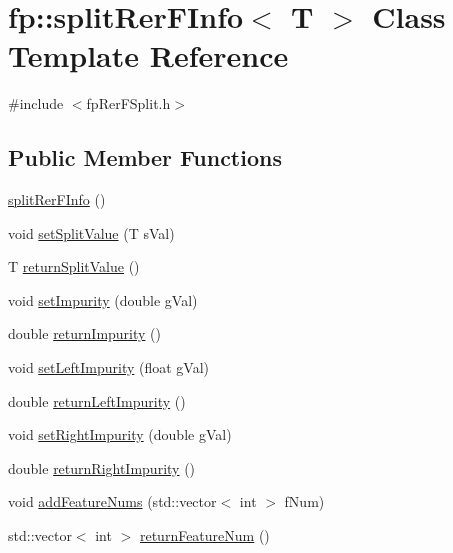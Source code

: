\hypertarget{classfp_1_1splitRerFInfo}{}\section{fp\+:\+:split\+Rer\+F\+Info$<$ T $>$ Class Template Reference}
\label{classfp_1_1splitRerFInfo}


{\ttfamily \#include $<$fp\+Rer\+F\+Split.\+h$>$}

\subsection*{Public Member Functions}
\begin{DoxyCompactItemize}
\item 
\hyperlink{classfp_1_1splitRerFInfo_a2071cff382e045b856f29d9fed7f2e8e}{split\+Rer\+F\+Info} ()
\item 
void \hyperlink{classfp_1_1splitRerFInfo_a461777b91ece075a5a2123c348f4b4c4}{set\+Split\+Value} (T s\+Val)
\item 
T \hyperlink{classfp_1_1splitRerFInfo_a99b2dfae4d0e606be9511bd6c61b53dc}{return\+Split\+Value} ()
\item 
void \hyperlink{classfp_1_1splitRerFInfo_ac1ad89a7c7cbc2bd8f7ffb3aa523b1eb}{set\+Impurity} (double g\+Val)
\item 
double \hyperlink{classfp_1_1splitRerFInfo_a79dc984d11d69e61abc7f546e9effd90}{return\+Impurity} ()
\item 
void \hyperlink{classfp_1_1splitRerFInfo_af7409ccd3d123780aa9e6b3fe24df589}{set\+Left\+Impurity} (float g\+Val)
\item 
double \hyperlink{classfp_1_1splitRerFInfo_a744a6c0b2f76ce9b74f35a59642b9837}{return\+Left\+Impurity} ()
\item 
void \hyperlink{classfp_1_1splitRerFInfo_a31171db1e7a89e0448668c03cd4adf7c}{set\+Right\+Impurity} (double g\+Val)
\item 
double \hyperlink{classfp_1_1splitRerFInfo_a436810df96a0cdec2c8aab72609a1210}{return\+Right\+Impurity} ()
\item 
void \hyperlink{classfp_1_1splitRerFInfo_a2494bbdac133a9e3276a2d7ed7ac909e}{add\+Feature\+Nums} (std\+::vector$<$ int $>$ f\+Num)
\item 
std\+::vector$<$ int $>$ \hyperlink{classfp_1_1splitRerFInfo_a469fc628f56cab1f2fa6f28476ddec55}{return\+Feature\+Num} ()
\end{DoxyCompactItemize}
